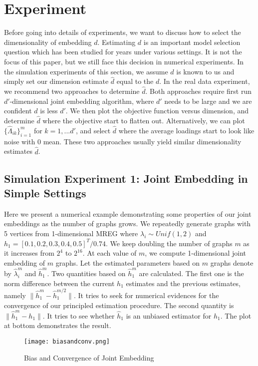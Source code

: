 \documentclass[10pt,journal,compsoc]{IEEEtran}
\begin{document}
\section{Experiment}
Before going into details of experiments, we want to discuss how to select the dimensionality of embedding $d$. Estimating $d$ is an important model selection question which has been studied for years under various settings. It is not the focus of this paper, but we still face this decision in numerical experiments. In the simulation experiments of this section, we assume $d$ is known to us and simply set our dimension estimate $\hat{d}$ equal to the $d$. In the real data experiment, we recommend two approaches to determine $\hat{d}$. Both approaches require first run $d'$-dimensional joint embedding algorithm, where $d'$ needs to be large and we are confident $d$ is less $d'$. We then plot the objective function versus dimension, and determine $\hat{d}$ where the objective start to flatten out. Alternatively, we can plot $\{\hat{\Lambda}_{ik}\}_{i=1}^m$ for $k=1,...d'$, and select $\hat{d}$ where the average loadings start to look like noise with $0$ mean. These two approaches usually yield similar dimensionality estimates $\hat{d}$. 

\subsection{Simulation Experiment 1: Joint Embedding in Simple Settings}
\noindent Here we present a numerical example demonstrating some properties
of our joint embeddings as the number of graphs grows. We repeatedly generate graphs with 5 vertices from 1-dimensional MREG where $\lambda_i \sim Unif(1,2)$ and $h_1=[0.1,0.2,0.3,0.4,0.5]^T/0.74$. We keep doubling the number of graphs $m$ as it increases from $2^4$ to $2^{16}$. At each value of $m$, we compute 1-dimensional joint embedding of $m$ graphs. Let the estimated parameters based on $m$ graphs denote by $\hat{\lambda}_i^m$ and $\hat{h}_1^m$. Two quantities based on $\hat{h}_1^m$ are calculated. The first one is the norm difference between the current $h_1$ estimates and the previous estimates, namely $\|\hat{h}_1^m-\hat{h}_1^{m/2}\|$. It tries to seek for numerical evidences for the convergence of our principled estimation procedure. The second quantity is $\|\hat{h}^m_1-h_1\|$. It tries to see whether $\hat{h}_1$ is an unbiased estimator for $h_1$. The plot at bottom demonstrates the result. \\

\begin{figure}[!htbp]
	\centering
	\texttt{[image: biasandconv.png]}
	\caption{Bias and Convergence of Joint Embedding}
\end{figure}
\end{document}

